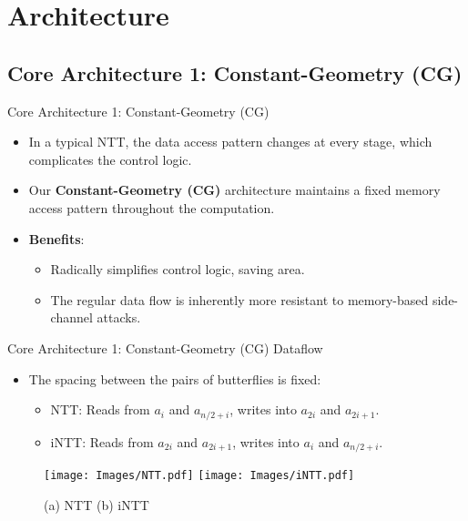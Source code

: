 \documentclass[
	10pt, t,
	hyperref={
		colorlinks,
		citecolor=CtpLatteTeal,
		linkcolor=CtpLatteTeal,
		urlcolor=CtpLatteBlue,
		pdfauthor={Bardia Taghavi},
		pdftitle={LightNTT: A Tiny NTT/iNTT Core for ML-DSA Featuring a Constant-Geometry Pipelined Design},
		pdfsubject={Cryptography},
		pdfkeywords={NTT, iNTT, ML-DSA, Constant-Geometry Pipelined Design},
		pdfcreator={Bardia Taghavi},
		pdfproducer={Bardia Taghavi}
		},
	aspectratio=1610,
	]
	{beamer}
\begin{document}

\section{Architecture}
\subsection{Core Architecture 1: Constant-Geometry (CG)}
\begin{frame}{Core Architecture 1: Constant-Geometry (CG)}
	\begin{itemize}\setlength{\itemsep}{1.5em}
		\item In a typical NTT, the data access pattern changes at every stage, which complicates the control logic.
		\item Our \textcolor<2->{CtpLatteBlue}{\textbf{Constant-Geometry (CG)}} architecture maintains a fixed memory access pattern throughout the computation.
		\item \textbf{Benefits}:
		\begin{itemize}\setlength{\itemsep}{2ex}\vspace{1ex}
			\item Radically simplifies control logic, saving area.
			\item The regular data flow is inherently more resistant to memory-based side-channel attacks.
		\end{itemize}
	\end{itemize}
\end{frame}
\begin{frame}{Core Architecture 1: Constant-Geometry (CG) Dataflow}
	\begin{itemize}\setlength{\itemsep}{1.5em}
		\item The spacing between the pairs of butterflies is fixed:
		\begin{itemize}\vspace{1ex}
			\item NTT: Reads from $a_i$ and $a_{n/2+i}$, writes into $a_{2i}$ and $a_{2i+1}$.
			\item iNTT: Reads from $a_{2i}$ and $a_{2i+1}$, writes into $a_i$ and $a_{n/2+i}$.
		\end{itemize}
	\end{itemize}
	\begin{figure}
		\texttt{[image: Images/NTT.pdf]}
		\hspace{1em}
		\texttt{[image: Images/iNTT.pdf]}
		\caption{(a) NTT \hspace{23em} (b) iNTT}
	\end{figure}
\end{frame}
\end{document}
